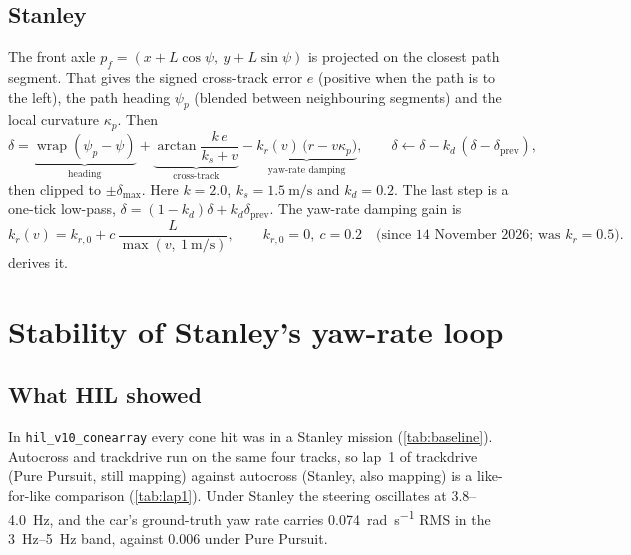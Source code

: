 \documentclass[11pt,a4paper]{article}
\newcommand{\wrap}{\operatorname{wrap}}
\begin{document}
\subsection{Stanley}
The front axle $p_f = (x + L\cos\psi,\ y + L\sin\psi)$ is projected on the closest path
segment. That gives the signed cross-track error $e$ (positive when the path is to the
left), the path heading $\psi_p$ (blended between neighbouring segments) and the local
curvature $\kappa_p$. Then
\begin{equation}
\delta = \underbrace{\wrap(\psi_p - \psi)}_{\text{heading}}
       + \underbrace{\arctan\frac{k\,e}{k_s + v}}_{\text{cross-track}}
       - \underbrace{k_r(v)\,\big(r - v\kappa_p\big)}_{\text{yaw-rate damping}},
\qquad
\delta \leftarrow \delta - k_d\,(\delta - \delta_{\text{prev}}),
\label{eq:stanley}
\end{equation}
then clipped to $\pm\delta_{\max}$. Here $k = 2.0$, $k_s = \SI{1.5}{\metre\per\second}$ and
$k_d = 0.2$. The last step is a one-tick low-pass,
$\delta = (1-k_d)\delta + k_d\delta_{\text{prev}}$. The yaw-rate damping gain is
\begin{equation}
k_r(v) = k_{r,0} + c\,\frac{L}{\max(v,\ \SI{1}{\metre\per\second})},
\qquad k_{r,0} = 0,\ c = 0.2 \quad\text{(since 14 November 2026; was } k_r = 0.5\text{)} .
\label{eq:kr}
\end{equation}
 derives it.

\section{Stability of Stanley's yaw-rate loop}\label{sec:stability}

\subsection{What HIL showed}
In \texttt{hil\_v10\_conearray} every cone hit was in a Stanley mission
(\cref{tab:baseline}). Autocross and trackdrive run on the same four tracks, so lap~1 of
trackdrive (Pure Pursuit, still mapping) against autocross (Stanley, also mapping) is a
like-for-like comparison (\cref{tab:lap1}). Under Stanley the steering oscillates at
\SI{3.8}{}--\SI{4.0}{\hertz}, and the car's ground-truth yaw rate carries
\SI{0.074}{\radian\per\second} RMS in the \SIrange{3}{5}{\hertz} band, against
\SI{0.006}{} under Pure Pursuit.
\end{document}
